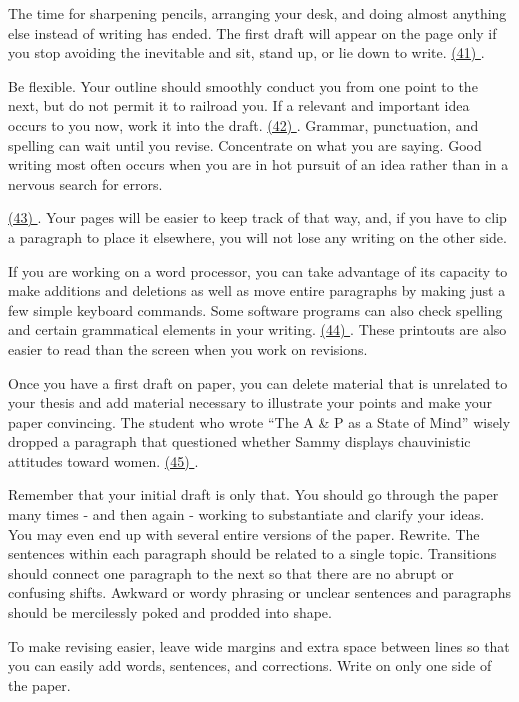 \qquad The time for sharpening pencils, arranging your desk, and doing almost anything else instead of writing has ended. The first draft will appear on the page only if you stop avoiding the inevitable and sit, stand up, or lie down to write. \ul{(41) \qquad\qquad}.

\qquad Be flexible. Your outline should smoothly conduct you from one point to the next, but do not permit it to railroad you. If a relevant and important idea occurs to you now, work it into the draft. \ul{(42) \qquad\qquad}. Grammar, punctuation, and spelling can wait until you revise. Concentrate on what you are saying. Good writing most often occurs when you are in hot pursuit of an idea rather than in a nervous search for errors.

\qquad \ul{(43) \qquad\qquad}. Your pages will be easier to keep track of that way, and, if you have to clip a paragraph to place it elsewhere, you will not lose any writing on the other side.

\qquad If you are working on a word processor, you can take advantage of its capacity to make additions and deletions as well as move entire paragraphs by making just a few simple keyboard commands. Some software programs can also check spelling and certain grammatical elements in your writing. \ul{(44) \qquad\qquad}. These printouts are also easier to read than the screen when you work on revisions.

\qquad Once you have a first draft on paper, you can delete material that is unrelated to your thesis and add material necessary to illustrate your points and make your paper convincing. The student who wrote “The A \& P as a State of Mind” wisely dropped a paragraph that questioned whether Sammy displays chauvinistic attitudes toward women. \ul{(45) \qquad\qquad}.

\qquad Remember that your initial draft is only that. You should go through the paper many times - and then again - working to substantiate and clarify your ideas. You may even end up with several entire versions of the paper. Rewrite. The sentences within each paragraph should be related to a single topic. Transitions should connect one paragraph to the next so that there are no abrupt or confusing shifts. Awkward or wordy phrasing or unclear sentences and paragraphs should be mercilessly poked and prodded into shape.

\qquad [A] To make revising easier, leave wide margins and extra space between lines so that you can easily add words, sentences, and corrections. Write on only one side of the paper.

